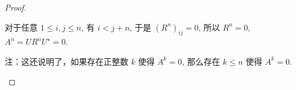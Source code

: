 \documentclass{article}
\begin{document}
\begin{spacing}{1.5}
\begin{itemize}
\begin{proof}
\begin{itemize}
            对于任意 $1\leq i,j\leq n$, 有 $i < j + n$, 于是 $(R^n)_{ij} = 0$, 所以 $R^n = 0$, $A^n = UR^n U^\star = 0$.

            注：这还说明了，如果存在正整数 $k$ 使得 $A^k = 0$, 那么存在 $k \leq n$ 使得 $A^k = 0$.
        \end{itemize}
    \end{proof}

\end{itemize}
    
\end{spacing}
\end{document}
